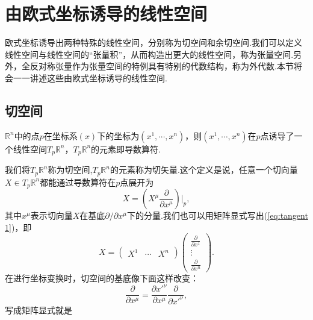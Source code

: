 \section{由欧式坐标诱导的线性空间}
    欧式坐标诱导出两种特殊的线性空间，分别称为切空间和余切空间.我们可以定义线性空间与线性空间的“张量积”，从而构造出更大的线性空间，称为张量空间.另外，全反对称张量作为张量空间的特例具有特别的代数结构，称为外代数.本节将会一一讲述这些由欧式坐标诱导的线性空间.
    \subsection{切空间}
        \begin{definition}
            $\mathbb{R}^n$中的点$p$在坐标系$(x)$下的坐标为$(x^1,\cdots,x^n)$，则$(x^1,\cdots,x^n)$在$p$点诱导了一个线性空间$T_p\mathbb{R}^n$，$T_p\mathbb{R}^n$的元素即导数算符.
        \end{definition}
        我们将$T_p\mathbb{R}^n$称为切空间,$T_p\mathbb{R}^n$的元素称为切矢量.这个定义是说，任意一个切向量$X\in T_p\mathbb{R}^n$都能通过导数算符在$p$点展开为
        \begin{equation}\label{eq:tangent 1}
            X=\left(X^\mu\frac{\partial}{\partial x^\mu}\right)\Bigg|_p,
        \end{equation}
        其中$x^\mu$表示切向量$X$在基底$\partial/\partial x^\mu$下的分量.我们也可以用矩阵显式写出(\ref{eq:tangent 1})，即
        \begin{equation}\label{eq:tangent 2}
            X=
            \begin{pmatrix}
                X^1&\cdots&X^n	
            \end{pmatrix}
            \begin{pmatrix}
                \frac{\partial}{\partial x^1}\\
                \vdots\\
                \frac{\partial}{\partial x^n}	
            \end{pmatrix}.
        \end{equation}
        在进行坐标变换时，切空间的基底像下面这样改变：
        \begin{equation}\label{eq:tangent 3}
            \frac{\partial}{\partial x^\mu}=\frac{\partial x'^\nu}{\partial x^\mu}\frac{\partial}{\partial x'^\nu},
        \end{equation}
        写成矩阵显式就是
